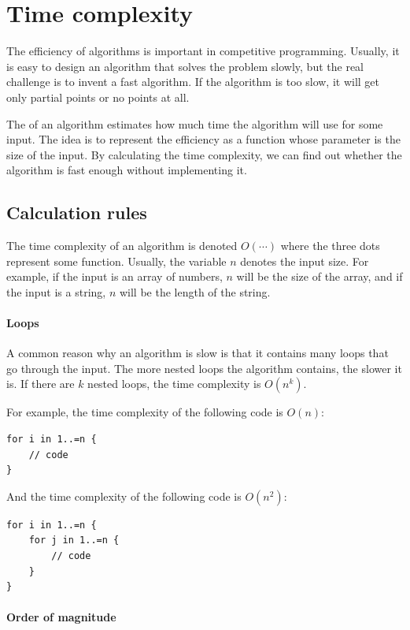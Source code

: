 \chapter{Time complexity}


The efficiency of algorithms is important in competitive programming.
Usually, it is easy to design an algorithm
that solves the problem slowly,
but the real challenge is to invent a
fast algorithm.
If the algorithm is too slow, it will get only
partial points or no points at all.

The  of an algorithm
estimates how much time the algorithm will use
for some input.
The idea is to represent the efficiency
as a function whose parameter is the size of the input.
By calculating the time complexity,
we can find out whether the algorithm is fast enough
without implementing it.

\section{Calculation rules}

The time complexity of an algorithm
is denoted $O(\cdots)$
where the three dots represent some
function.
Usually, the variable $n$ denotes
the input size.
For example, if the input is an array of numbers,
$n$ will be the size of the array,
and if the input is a string,
$n$ will be the length of the string.

\subsubsection*{Loops}

A common reason why an algorithm is slow is
that it contains many loops that go through the input.
The more nested loops the algorithm contains,
the slower it is.
If there are $k$ nested loops,
the time complexity is $O(n^k)$.

For example, the time complexity of the following code is $O(n)$:
\begin{lstlisting}
for i in 1..=n {
    // code
}
\end{lstlisting}

And the time complexity of the following code is $O(n^2)$:
\begin{lstlisting}
for i in 1..=n {
    for j in 1..=n {
        // code
    }
}
\end{lstlisting}

\subsubsection*{Order of magnitude}

